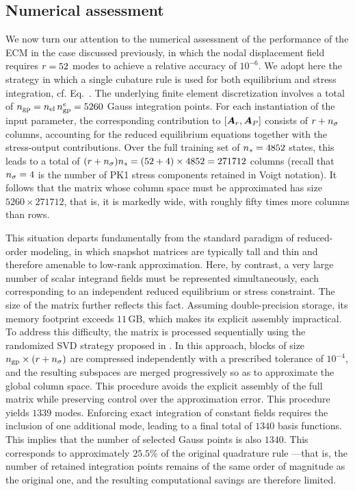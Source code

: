 \documentclass[11pt,a4paper]{article}
\newcommand{\PROMPT}[1]{ }
\begin{document}
\subsection{Numerical assessment}
\label{sec:numassHROMstd}
\PROMPT{}



We now turn our attention to the numerical assessment of the performance of the ECM in the case discussed previously, in which the nodal displacement field requires $r = 52$ modes to achieve a relative accuracy of $10^{-6}$. We adopt here the strategy in which a single cubature rule is used for both equilibrium and stress integration, cf. Eq.~. The underlying finite element discretization involves a total of $n_{\mathrm{gp}} = n_{\mathrm{el}} \,n_{\mathrm{gp}}^{e} = 5260$ Gauss integration points. For each instantiation of the input parameter, the corresponding contribution to $\left[\bm{A}_{r},\bm{A}_{P}\right]$ consists of $r + n_{\sigma}$ columns, accounting for the reduced equilibrium equations together with the stress-output contributions. Over the full training set of $n_s = 4852$ states, this leads to a total of $(r + n_{\sigma})n_s = (52+4)\times 4852 = 271712$ columns (recall that $n_{\sigma} = 4$ is the number of PK1 stress components retained in Voigt notation). It follows that the matrix whose column space must be approximated has size $5260 \times 271712$, that is, it is markedly wide, with roughly fifty times more columns than rows.

This situation departs fundamentally from the standard paradigm of reduced-order modeling, in which snapshot matrices are typically tall and thin and therefore amenable to low-rank approximation. Here, by contrast, a very large number of scalar integrand fields must be represented simultaneously, each corresponding to an independent reduced equilibrium or stress constraint. The size of the matrix further reflects this fact. Assuming double-precision storage, its memory footprint exceeds $11\,\mathrm{GB}$, which makes its explicit assembly impractical.  To address this difficulty, the matrix is processed sequentially using the randomized SVD strategy proposed in \cite{hernandez2024cecm}. In this approach, blocks of size $n_{\mathrm{gp}} \times (r + n_{\sigma})$ are compressed independently with a prescribed tolerance of $10^{-4}$, and the resulting subspaces are merged progressively so as to approximate the global column space. This procedure avoids the explicit assembly of the full matrix while preserving control over the approximation error. This procedure yields $1339$ modes. Enforcing exact integration of constant fields requires the inclusion of one additional mode, leading to a final total of $1340$ basis functions. This implies that the number of selected Gauss points is also $1340$. This corresponds to approximately $25.5\%$ of the original quadrature rule ---that is, the number of retained integration points remains of the same order of magnitude as the original one, and the resulting computational savings are therefore limited.
\end{document}
